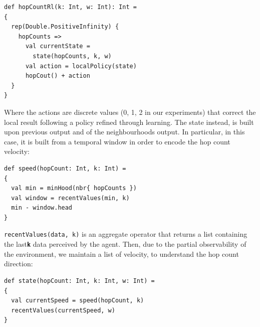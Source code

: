\documentclass[conference]{IEEEtran}
\begin{document}
 \begin{verbatim}
def hopCountRl(k: Int, w: Int): Int = 
{
  rep(Double.PositiveInfinity) { 
    hopCounts => 
      val currentState = 
        state(hopCounts, k, w)
      val action = localPolicy(state)
      hopCout() + action
  }
}
\end{verbatim}

Where the actions are discrete values (0, 1, 2 in our experiments) that correct the local result following a policy refined through learning.
%
The state instead, is built upon previous output and of the neighbourhoods output.
 In particular, in this case, it is built from a temporal window in order to encode the hop count velocity:
\begin{verbatim}
def speed(hopCount: Int, k: Int) =
{
  val min = minHood(nbr{ hopCounts })
  val window = recentValues(min, k)
  min - window.head 
}
\end{verbatim}
\texttt{recentValues(data, k)} is an aggregate operator that returns a list containing the last\textbf{\texttt{k}} data perceived by the agent.
Then, due to the partial observability of the environment, we maintain a 
 list of velocity, to understand the hop count direction:

 \begin{verbatim}
def state(hopCount: Int, k: Int, w: Int) =
{
  val currentSpeed = speed(hopCount, k)
  recentValues(currentSpeed, w)
}
\end{verbatim}
\end{document}
